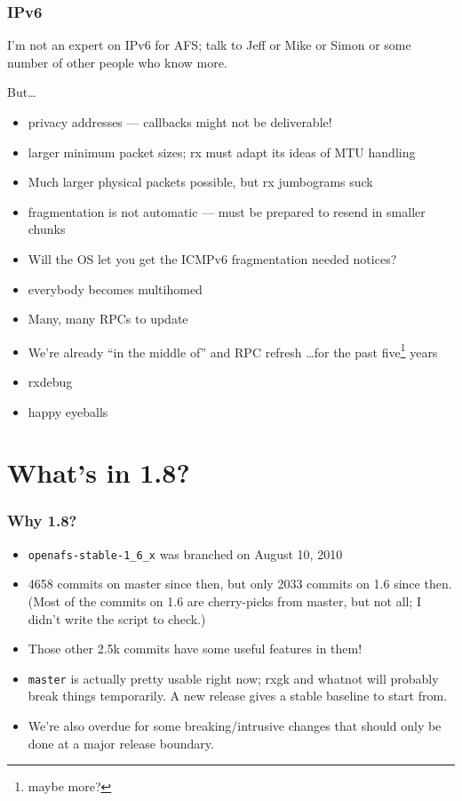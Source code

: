 \documentclass{beamer}
\begin{document}
\begin{frame}
\frametitle{IPv6}
I'm not an expert on IPv6 for AFS; talk to Jeff or Mike or Simon
or some number of other people who know more.

But\ldots
\begin{itemize}
\item{privacy addresses --- callbacks might not be deliverable!}
\item{larger minimum packet sizes; rx must adapt its ideas of MTU handling}
\item{Much larger physical packets possible, but rx jumbograms suck}
\item{fragmentation is not automatic --- must be prepared to resend
	in smaller chunks}
\item{Will the OS let you get the ICMPv6 fragmentation needed notices?}
\item{everybody becomes multihomed}
\item{Many, many RPCs to update}
\item{We're already ``in the middle of'' and RPC refresh \ldots for the
	past five\footnote{maybe more?} years}
\item{rxdebug}
\item{happy eyeballs}
\end{itemize}
\end{frame}

\section{What's in 1.8?}

\begin{frame}[fragile]
\frametitle{Why 1.8?}
\begin{itemize}
\item{\verb+openafs-stable-1_6_x+ was branched on August 10, 2010}
\item{4658 commits on master since then, but only 2033 commits on
1.6 since then.  (Most of the commits on 1.6 are cherry-picks from
master, but not all; I didn't write the script to check.)}
\item{Those other 2.5k commits have some useful features in them!}
\item{\verb+master+ is actually pretty usable right now; rxgk and
whatnot will probably break things temporarily.  A new release gives
a stable baseline to start from.}
\item{We're also overdue for some breaking/intrusive changes that
should only be done at a major release boundary.}
\end{itemize}
\end{frame}
\end{document}
